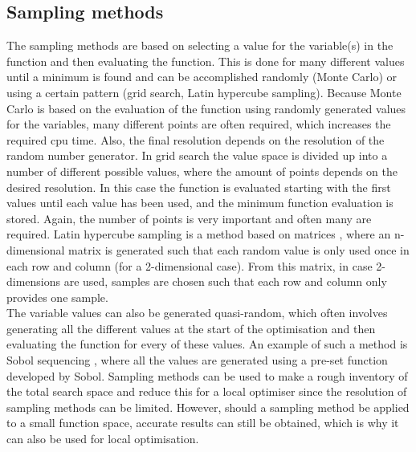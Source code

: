 \subsection{Sampling methods}
\label{subsec:sampmeth}
The sampling methods are based on selecting a value for the variable(s) in the function and then evaluating the function. This is done for many different values until a minimum is found and can be accomplished randomly (Monte Carlo) or using a certain pattern (grid search, Latin hypercube sampling). Because Monte Carlo is based on the evaluation of the function using randomly generated values for the variables, many different points are often required, which increases the required cpu time. Also, the final resolution depends on the resolution of the random number generator. In grid search the value space is divided up into a number of different possible values, where the amount of points depends on the desired resolution. In this case the function is evaluated starting with the first values until each value has been used, and the minimum function evaluation is stored. Again, the number of points is very important and often many are required. Latin hypercube sampling is a method based on matrices \cite{helton2003}, where an n-dimensional matrix is generated such that each random value is only used once in each row and column (for a 2-dimensional case). From this matrix, in case 2-dimensions are used, samples are chosen such that each row and column only provides one sample.\\
The variable values can also be generated quasi-random, which often involves generating all the different values at the start of the optimisation and then evaluating the function for every of these values. An example of such a method is Sobol sequencing \cite{sobol1998}, where all the values are generated using a pre-set function developed by Sobol. Sampling methods can be used to make a rough inventory of the total search space and reduce this for a local optimiser since the resolution of sampling methods can be limited. However, should a sampling method be applied to a small function space, accurate results can still be obtained, which is why it can also be used for local optimisation.


